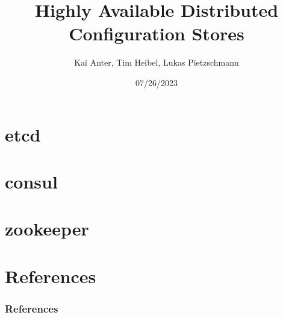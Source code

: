 \documentclass[aspectratio=169, usepdftitle=false]{beamer}
\title[Distributed Config Stores]{Highly Available Distributed Configuration Stores}
\author[Kai, Tim, Lukas]{Kai Anter, Tim Heibel, Lukas Pietzschmann}
\subtitle{}
\institute{Institute of Distributed Systems}
\date{07/26/2023}
\begin{document}
\maketitle

\section{etcd}


\section{consul}


\section{zookeeper}


\section{References}
\begin{frame}[allowframebreaks]
	\frametitle{References}
	\printbibliography
\end{frame}
\end{document}
